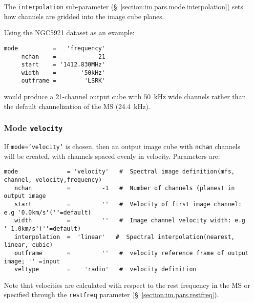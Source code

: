 The {\tt interpolation} sub-parameter
(\S~\ref{section:im.pars.mode.interpolation}) sets how channels are
gridded into the image cube planes.

Using the NGC5921 dataset as an example:
\small
\begin{verbatim}
mode          =   'frequency'       
     nchan    =            21        
     start    = '1412.830MHz'     
     width    =       '50kHz'        
     outframe =        'LSRK'
\end{verbatim}
\normalsize
would produce a 21-channel output cube with 50~kHz wide channels
rather than the default channelization of the MS (24.4~kHz).


\subsubsection{Mode {\tt velocity} }
\label{section:im.pars.mode.velocity}

If {\tt mode='velocity'} is chosen, then an output image cube
with {\tt nchan} channels will be created, with channels spaced
evenly in velocity.  Parameters are:
\small
\begin{verbatim}
mode              = 'velocity'   #  Spectral image definition(mfs, channel, velocity,frequency)
   nchan          =         -1   #  Number of channels (planes) in output image
   start          =         ''   #  Velocity of first image channel: e.g '0.0km/s'(''=default)
   width          =         ''   #  Image channel velocity width: e.g '-1.0km/s'(''=default)
   interpolation  =  'linear'   #  Spectral interpolation(nearest, linear, cubic)
   outframe       =         ''   #  velocity reference frame of output image; '' =input
   veltype        =    'radio'   #  velocity definition
\end{verbatim}
\normalsize
Note that velocities are calculated with respect to the rest frequency
in the MS or specified through the {\tt restfreq} parameter
(\S~\ref{section:im.pars.restfreq}).

